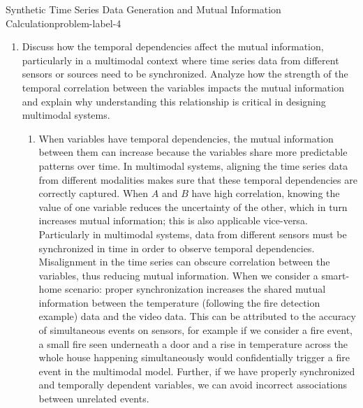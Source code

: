 \begin{problem}{Synthetic Time Series Data Generation and Mutual Information Calculation}{problem-label-4}
	\begin{enumerate}[{a}]
		\item Discuss how the temporal dependencies affect the mutual information, particularly in a multimodal context where time series data from different sensors or sources need to be synchronized. Analyze how the strength of the temporal correlation between the variables impacts the mutual information and explain why understanding this relationship is critical in designing multimodal systems.
		\begin{enumerate}[label = (\roman*)]
			\item When variables have temporal dependencies, the mutual information between them can increase because the variables share more predictable patterns over time. In multimodal systems, aligning the time series data from different modalities makes sure that these temporal dependencies are correctly captured. When $A$ and $B$ have high correlation, knowing the value of one variable reduces the uncertainty of the other, which in turn increases mutual information; this is also applicable vice-versa. Particularly in multimodal systems, data from different sensors must be synchronized in time in order to observe temporal dependencies. Misalignment in the time series can obscure correlation between the variables, thus reducing mutual information. When we consider a smart-home scenario: proper synchronization increases the shared mutual information between the temperature (following the fire detection example) data and the video data. This can be attributed to the accuracy of simultaneous events on sensors, for example if we consider a fire event, a small fire seen underneath a door and a rise in temperature across the whole house happening simultaneously would confidentially trigger a fire event in the multimodal model. Further, if we have properly synchronized and temporally dependent variables, we can avoid incorrect associations between unrelated events. 
		\end{enumerate}
	\end{enumerate}
\end{problem} 


	
	
	
	
	
	

